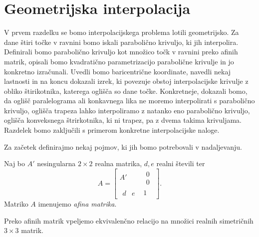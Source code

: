 \documentclass[mat1]{fmfdelo}
\begin{document}

\section{Geometrijska interpolacija}

V prvem razdelku se bomo interpolacijskega problema lotili geometrijsko. Za dane štiri točke v ravnini bomo iskali parabolično krivuljo, ki jih interpolira. Definirali bomo parabolično krivuljo kot množico točk v ravnini preko afinih matrik, opisali bomo kvadratično parametrizacijo parabolične krivulje in jo konkretno izračunali. Uvedli bomo baricentrične koordinate, navedli nekaj lastnosti in na koncu dokazali izrek, ki povezuje obstoj interpolacijske krivulje z obliko štirikotnika, katerega oglišča so dane točke. Konkretneje, dokazali bomo, da oglišč paralelograma ali konkavnega lika ne moremo interpolirati s parabolično krivuljo, oglišča trapeza lahko interpoliramo z natanko eno parabolično krivuljo, oglišča konveksnega štrirkotnika, ki ni trapez, pa z dvema takima krivuljama. Razdelek bomo zaključili s primerom konkretne interpolacijske naloge.

Za začetek definirajmo nekaj pojmov, ki jih bomo potrebovali v nadaljevanju.

\begin{definicija}
Naj bo $A'$ nesingularna $2\times2$ realna matrika, $d, e$ realni števili ter 
$$ A = 
\begin{bmatrix}
A' &
\begin{matrix}
0 \\
0
\end{matrix}
\\
\begin{matrix}
d & e
\end{matrix}
 & 1
\end{bmatrix}
.$$
Matriko $A$ imenujemo \emph{afina matrika}. 
\end{definicija}


Preko afinih matrik vpeljemo ekvivalenčno relacijo na množici realnih simetričnih $3 \times 3$ matrik.
\end{document}

